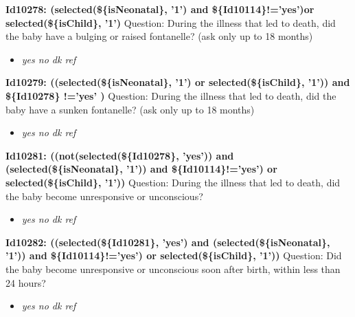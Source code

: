 \documentclass{article}%
\begin{document}
\textbf{Id10278: (selected(\$\{isNeonatal\}, '1') and \$\{Id10114\}!='yes')or selected(\$\{isChild\}, '1')\newline%
}%
Question: During the illness that led to death, did the baby have a bulging or raised fontanelle? (ask only up to 18 months)\newline%
%
\begin{itemize}%
\item%
\textit{yes\newline%
 no\newline%
 dk\newline%
 ref\newline%
}%
\end{itemize}%
\textbf{Id10279: ((selected(\$\{isNeonatal\}, '1') or selected(\$\{isChild\}, '1')) and \$\{Id10278\} !='yes' )\newline%
}%
Question: During the illness that led to death, did the baby have a sunken fontanelle? (ask only up to 18 months)\newline%
%
\begin{itemize}%
\item%
\textit{yes\newline%
 no\newline%
 dk\newline%
 ref\newline%
}%
\end{itemize}%
\textbf{Id10281: ((not(selected(\$\{Id10278\}, 'yes')) and (selected(\$\{isNeonatal\}, '1')) and \$\{Id10114\}!='yes') or selected(\$\{isChild\}, '1'))\newline%
}%
Question: During the illness that led to death, did the baby become unresponsive or unconscious?\newline%
%
\begin{itemize}%
\item%
\textit{yes\newline%
 no\newline%
 dk\newline%
 ref\newline%
}%
\end{itemize}%
\textbf{Id10282: ((selected(\$\{Id10281\}, 'yes') and (selected(\$\{isNeonatal\}, '1')) and \$\{Id10114\}!='yes') or selected(\$\{isChild\}, '1'))\newline%
}%
Question: Did the baby become unresponsive or unconscious soon after birth, within less than 24 hours?\newline%
%
\begin{itemize}%
\item%
\textit{yes\newline%
 no\newline%
 dk\newline%
 ref\newline%
}%
\end{itemize}%
\end{document}
